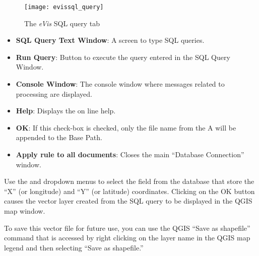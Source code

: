 \begin{figure}[ht]
   \begin{center}
\caption{\label{evissql_query}The \emph{eVis} SQL query tab \nixcaption}
\texttt{[image: evissql\_query]}
\end{center}
\end{figure}

\begin{itemize}
\item \textbf{SQL Query Text Window}: A screen to type SQL queries.
\item \textbf{Run Query}: Button to execute the query entered in the SQL Query Window.
\item \textbf{Console Window}: The console window where messages related to processing are
displayed.
\item \textbf{Help}: Displays the on line help.
\item \textbf{OK}: If this check-box is checked, only the file name from the A will be appended to
the Base Path.
\item \textbf{Apply rule to all documents}: Closes the main ``Database Connection'' window.
\end{itemize}

Use the  and  dropdown menus to select the field
from the database that store the ``X'' (or longitude) and ``Y'' (or latitude) coordinates. Clicking
on the OK button causes the vector layer created from the SQL query to be displayed in the QGIS map
window.

To save this vector file for future use, you can use the QGIS ``Save as shapefile'' command that is
accessed by right clicking on the layer name in the QGIS map legend and then selecting ``Save as
shapefile.''

\begin{Tip}\caption{\textsc{Creating a vector layer from a Microsoft Excel Worksheet}}
\end{Tip}

